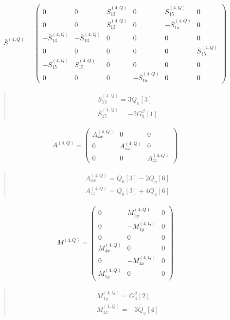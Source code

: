 \documentclass[fleqn,10pt]{jsarticle}
\begin{document}
\begin{align*}
\bar{S}^{(4,Q)} = \begin{pmatrix} 0 & 0 & \bar{S}^{(4,Q)}_{13} & 0 & \bar{S}^{(4,Q)}_{15} & 0 \\ 0 & 0 & \bar{S}^{(4,Q)}_{13} & 0 & - \bar{S}^{(4,Q)}_{15} & 0 \\ - \bar{S}^{(4,Q)}_{13} & - \bar{S}^{(4,Q)}_{13} & 0 & 0 & 0 & 0 \\ 0 & 0 & 0 & 0 & 0 & \bar{S}^{(4,Q)}_{15} \\ - \bar{S}^{(4,Q)}_{15} & \bar{S}^{(4,Q)}_{15} & 0 & 0 & 0 & 0 \\ 0 & 0 & 0 & - \bar{S}^{(4,Q)}_{15} & 0 & 0 \end{pmatrix}
\end{align*}
\begin{quote}
\begin{align*}
& \bar{S}^{(4,Q)}_{13} = 3 Q_{u}[3] \\
& \bar{S}^{(4,Q)}_{15} = - 2 G_{3}^{\beta}[1]
\end{align*}
\end{quote}
\begin{align*}
A^{(4,Q)} = \begin{pmatrix} A^{(4,Q)}_{xx} & 0 & 0 \\ 0 & A^{(4,Q)}_{xx} & 0 \\ 0 & 0 & A^{(4,Q)}_{zz} \end{pmatrix}
\end{align*}
\begin{quote}
\begin{align*}
& A^{(4,Q)}_{xx} = Q_{0}[3] - 2 Q_{u}[6] \\
& A^{(4,Q)}_{zz} = Q_{0}[3] + 4 Q_{u}[6]
\end{align*}
\end{quote}
\begin{align*}
M^{(4,Q)} = \begin{pmatrix} 0 & M^{(4,Q)}_{1y} & 0 \\ 0 & - M^{(4,Q)}_{1y} & 0 \\ 0 & 0 & 0 \\ M^{(4,Q)}_{4x} & 0 & 0 \\ 0 & - M^{(4,Q)}_{4x} & 0 \\ M^{(4,Q)}_{1y} & 0 & 0 \end{pmatrix}
\end{align*}
\begin{quote}
\begin{align*}
& M^{(4,Q)}_{1y} = G_{3}^{\beta}[2] \\
& M^{(4,Q)}_{4x} = - 3 Q_{u}[4]
\end{align*}
\end{quote}
\end{document}
